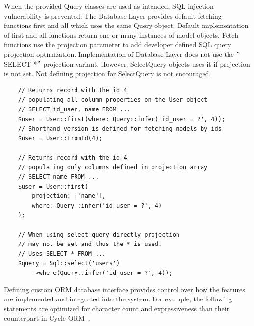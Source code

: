 When the provided Query classes are used as intended, SQL injection vulnerability is prevented.
The Database Layer provides default fetching functions first and all which uses the same Query object.
Default implementation of first and all functions return one or many instances of model objects.
Fetch functions use the projection parameter to add developer defined SQL query projection optimization.
Implementation of Database Layer does not use the \("\)SELECT *\("\) projection variant.
However, SelectQuery objects uses it if projection is not set.
Not defining projection for SelectQuery is not encouraged.

\begin{verbatim}
    // Returns record with the id 4
    // populating all column properties on the User object
    // SELECT id_user, name FROM ...
    $user = User::first(where: Query::infer('id_user = ?', 4));
    // Shorthand version is defined for fetching models by ids
    $user = User::fromId(4);

    // Returns record with the id 4
    // populating only columns defined in projection array
    // SELECT name FROM ...
    $user = User::first(
        projection: ['name'],
        where: Query::infer('id_user = ?', 4)
    );

    // When using select query directly projection
    // may not be set and thus the * is used.
    // Uses SELECT * FROM ...
    $query = Sql::select('users')
        ->where(Query::infer('id_user = ?', 4));
\end{verbatim}

Defining custom ORM database interface provides control over how the features are implemented and integrated into the system.
For example, the following statements are optimized for character count and expressiveness than their counterpart
in Cycle ORM~\parencite{cycle_orm_crd}.

